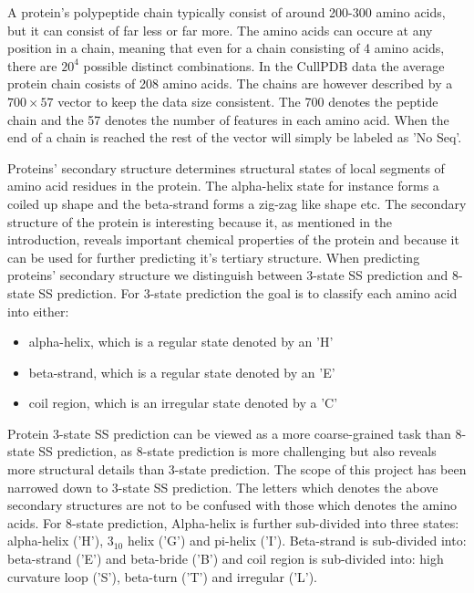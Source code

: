 \documentclass{article}
\begin{document}
A protein's polypeptide chain typically consist of around 200-300 amino acids, but it can consist of far less or far more. The amino acids can occure at any position in a chain, meaning that even for a chain consisting of 4 amino acids, there are $20^4$ possible distinct combinations. In the CullPDB data the average protein chain cosists of 208 amino acids. The chains are however described by a $700\times57$ vector to keep the data size consistent. The 700 denotes the peptide chain and the 57 denotes the number of features in each amino acid. When the end of a chain is reached the rest of the vector will simply be labeled as 'No Seq'. 

Proteins' secondary structure determines structural states of local segments of amino acid residues in the protein. The alpha-helix state for instance forms a coiled up shape and the beta-strand forms a zig-zag like shape etc. The secondary structure of the protein is interesting because it, as mentioned in the introduction, reveals important chemical properties of the protein and because it can be used for further predicting it's tertiary structure. When predicting proteins' secondary structure we distinguish between 3-state SS prediction and 8-state SS prediction. For 3-state prediction the goal is to classify each amino acid into either:

\begin{itemize}
\item alpha-helix, which is a regular state denoted by an 'H'
\item beta-strand, which is a regular state denoted by an 'E'
\item coil region, which is an irregular state denoted by a 'C' 
\end{itemize}

Protein 3-state SS prediction can be viewed as a more coarse-grained task than 8-state SS prediction, as 8-state prediction is more challenging but also reveals more structural details than 3-state prediction. The scope of this project has been narrowed down to 3-state SS prediction. The letters which denotes the above secondary structures are not to be confused with those which denotes the amino acids. For 8-state prediction, Alpha-helix is further sub-divided into three states: alpha-helix ('H'), $3_{10}$ helix ('G') and pi-helix ('I'). Beta-strand is sub-divided into: beta-strand ('E') and beta-bride ('B') and coil region is sub-divided into: high curvature loop ('S'), beta-turn ('T') and irregular ('L'). 
\end{document}
